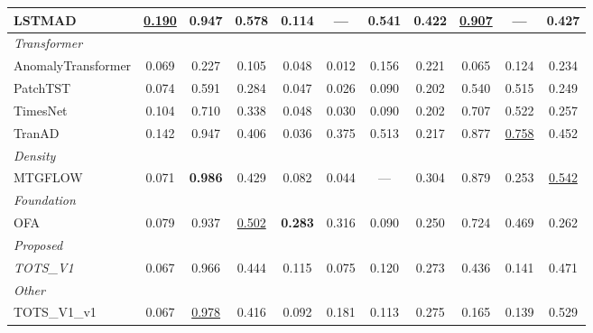 \begin{table}[t]
\begin{tabular}{lcccccccccc}
LSTMAD & \underline{0.190} & 0.947 & \textbf{0.578} & 0.114 & --- & \textbf{0.541} & \textbf{0.422} & \underline{0.907} & --- & 0.427 \\
\midrule
\multicolumn{11}{l}{\textit{Transformer}} \\
AnomalyTransformer & 0.069 & 0.227 & 0.105 & 0.048 & 0.012 & 0.156 & 0.221 & 0.065 & 0.124 & 0.234 \\
PatchTST & 0.074 & 0.591 & 0.284 & 0.047 & 0.026 & 0.090 & 0.202 & 0.540 & 0.515 & 0.249 \\
TimesNet & 0.104 & 0.710 & 0.338 & 0.048 & 0.030 & 0.090 & 0.202 & 0.707 & 0.522 & 0.257 \\
TranAD & 0.142 & 0.947 & 0.406 & 0.036 & 0.375 & 0.513 & 0.217 & 0.877 & \underline{0.758} & 0.452 \\
\midrule
\multicolumn{11}{l}{\textit{Density}} \\
MTGFLOW & 0.071 & \textbf{0.986} & 0.429 & 0.082 & 0.044 & --- & 0.304 & 0.879 & 0.253 & \underline{0.542} \\
\midrule
\multicolumn{11}{l}{\textit{Foundation}} \\
OFA & 0.079 & 0.937 & \underline{0.502} & \textbf{0.283} & 0.316 & 0.090 & 0.250 & 0.724 & 0.469 & 0.262 \\
\midrule
\multicolumn{11}{l}{\textit{Proposed}} \\
\textit{TOTS\_V1} & 0.067 & 0.966 & 0.444 & 0.115 & 0.075 & 0.120 & 0.273 & 0.436 & 0.141 & 0.471 \\
\midrule
\multicolumn{11}{l}{\textit{Other}} \\
TOTS\_V1\_v1 & 0.067 & \underline{0.978} & 0.416 & 0.092 & 0.181 & 0.113 & 0.275 & 0.165 & 0.139 & 0.529 \\
\bottomrule
\end{tabular}
\end{table}
